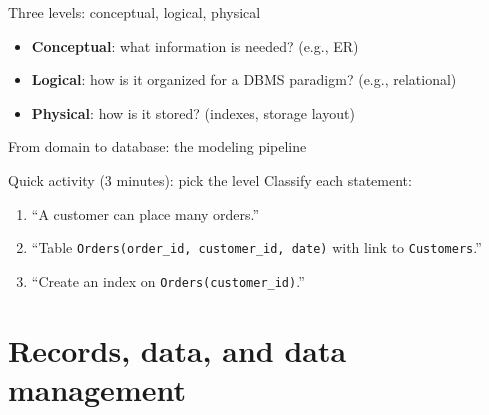 \documentclass[10pt,aspectratio=169]{beamer}
\begin{document}
\begin{frame}{Three levels: conceptual, logical, physical}
\begin{itemize}
  \item \textbf{Conceptual}: what information is needed? (e.g., ER)
  \item \textbf{Logical}: how is it organized for a DBMS paradigm? (e.g., relational)
  \item \textbf{Physical}: how is it stored? (indexes, storage layout)
\end{itemize}
\end{frame}

\begin{frame}{From domain to database: the modeling pipeline}
\begin{center}
\end{center}
\end{frame}

\begin{frame}{Quick activity (3 minutes): pick the level}
Classify each statement:
\begin{enumerate}
  \item ``A customer can place many orders.''
  \item ``Table \texttt{Orders(order\_id, customer\_id, date)} with link to \texttt{Customers}.''
  \item ``Create an index on \texttt{Orders(customer\_id)}.''
\end{enumerate}
\end{frame}

\section{Records, data, and data management}
\end{document}
